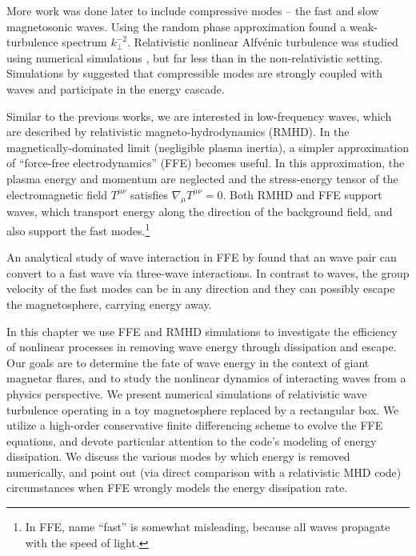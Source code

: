More work was done later to include compressive modes -- the fast and slow magnetosonic waves.
Using the random phase approximation \citet{2001JETP...93.1052K} found a weak-turbulence spectrum $k_{\perp}^{-2}$.
Relativistic nonlinear Alfv\'enic turbulence was studied using numerical simulations \citep{2005ApJ...621..324C,2012ApJ...744...32Z,2016ApJ...817...89Z,2016ApJ...831L..11T,2017MNRAS.472.4542T}, but far less than in the non-relativistic setting. 
Simulations by \citet{2016ApJ...831L..11T,2017MNRAS.472.4542T} suggested that compressible modes are strongly coupled with \alfven waves and participate in the energy cascade.

Similar to the previous works, we are interested in low-frequency waves, which are described by relativistic magneto-hydrodynamics (RMHD). In the magnetically-dominated limit (negligible plasma inertia), a simpler approximation of ``force-free electrodynamics'' (FFE) becomes useful. In this approximation, the plasma energy and momentum are neglected and the stress-energy tensor of the electromagnetic field $T^{\mu\nu}$ satisfies $\nabla_\mu T^{\mu\nu}=0$.
Both RMHD and FFE support \alfven waves, which transport energy along the direction of the background field, and also support the fast modes.\footnote{In FFE, name ``fast'' is somewhat misleading, because all waves propagate with the speed of light.}

An analytical study of wave interaction in FFE by \citet{1998PhRvD..57.3219T} found that an \alfven wave pair can convert to a fast wave via three-wave interactions. 
In contrast to \alfven waves, the group velocity of the fast modes can be in any direction and they can possibly escape the magnetosphere, carrying energy away.

In this chapter we use FFE and RMHD simulations to investigate the efficiency of nonlinear processes in removing wave energy through dissipation and escape.
Our goals are to determine the fate of wave energy in the context of giant magnetar flares, and to study the nonlinear dynamics of interacting \alfven waves from a physics perspective.
We present numerical simulations of relativistic \alfven wave turbulence operating in a toy magnetosphere replaced by a rectangular box.
We utilize a high-order conservative finite differencing scheme to evolve the FFE equations, and devote particular attention to the code's modeling of energy dissipation. We discuss the various modes by which energy is removed numerically, and point out (via direct comparison with a relativistic MHD code) circumstances when FFE wrongly models the energy dissipation rate.

